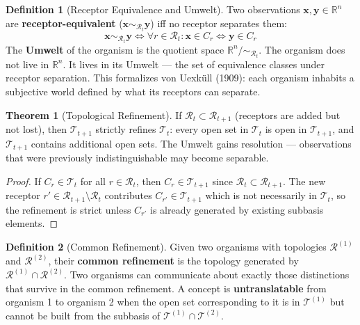 \documentclass[12pt]{article}
\theoremstyle{definition}
\newtheorem{definition}{Definition}
\newtheorem{theorem}{Theorem}
\begin{document}
\begin{definition}[Receptor Equivalence and Umwelt]
Two observations $\mathbf{x}, \mathbf{y} \in \mathbb{R}^n$ are \textbf{receptor-equivalent}
($\mathbf{x} \sim_{\mathcal{R}_t} \mathbf{y}$) iff no receptor separates them:
\[
\mathbf{x} \sim_{\mathcal{R}_t} \mathbf{y} \iff \forall r \in \mathcal{R}_t : \mathbf{x} \in C_r \Leftrightarrow \mathbf{y} \in C_r
\]
The \textbf{Umwelt} of the organism is the quotient space $\mathbb{R}^n / \sim_{\mathcal{R}_t}$.
The organism does not live in $\mathbb{R}^n$. It lives in its Umwelt --- the set of
equivalence classes under receptor separation. This formalizes von Uexk\"ull (1909):
each organism inhabits a subjective world defined by what its receptors can separate.
\end{definition}

\begin{theorem}[Topological Refinement]
If $\mathcal{R}_t \subset \mathcal{R}_{t+1}$ (receptors are added but not lost), then
$\mathcal{T}_{t+1}$ strictly refines $\mathcal{T}_t$: every open set in $\mathcal{T}_t$
is open in $\mathcal{T}_{t+1}$, and $\mathcal{T}_{t+1}$ contains additional open sets.
The Umwelt gains resolution --- observations that were previously indistinguishable may
become separable.
\end{theorem}

\begin{proof}
If $C_r \in \mathcal{T}_t$ for all $r \in \mathcal{R}_t$, then $C_r \in \mathcal{T}_{t+1}$
since $\mathcal{R}_t \subset \mathcal{R}_{t+1}$. The new receptor $r' \in \mathcal{R}_{t+1}
\setminus \mathcal{R}_t$ contributes $C_{r'} \in \mathcal{T}_{t+1}$ which is not necessarily
in $\mathcal{T}_t$, so the refinement is strict unless $C_{r'}$ is already generated by
existing subbasis elements.
\end{proof}

\begin{definition}[Common Refinement]
Given two organisms with topologies $\mathcal{R}^{(1)}$ and $\mathcal{R}^{(2)}$, their
\textbf{common refinement} is the topology generated by $\mathcal{R}^{(1)} \cap \mathcal{R}^{(2)}$.
Two organisms can communicate about exactly those distinctions that survive in the common
refinement. A concept is \textbf{untranslatable} from organism 1 to organism 2 when the
open set corresponding to it is in $\mathcal{T}^{(1)}$ but cannot be built from the subbasis
of $\mathcal{T}^{(1)} \cap \mathcal{T}^{(2)}$.
\end{definition}
\end{document}
